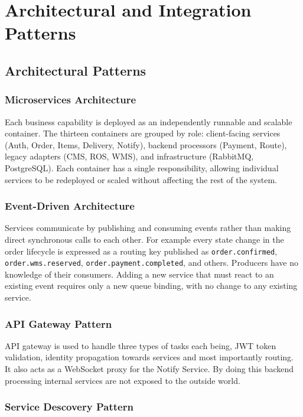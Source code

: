 \section{Architectural and Integration Patterns}
\subsection{Architectural Patterns}

\subsubsection{Microservices Architecture}

Each business capability is deployed as an independently runnable and scalable container. The thirteen containers are grouped by role: client-facing services (Auth, Order, Items, Delivery, Notify), backend processors (Payment, Route), legacy adapters (CMS, ROS, WMS), and infrastructure (RabbitMQ, PostgreSQL). Each container has a single responsibility, allowing individual services to be redeployed or scaled without affecting the rest of the system.

\subsubsection{Event-Driven Architecture}

Services communicate by publishing and consuming events rather than making direct synchronous calls to each other. For example every state change in the order lifecycle is expressed as a routing key published as \texttt{order.confirmed}, \texttt{order.wms.reserved}, \texttt{order.payment.completed}, and others. Producers have no knowledge of their consumers. Adding a new service that must react to an existing event requires only a new queue binding, with no change to any existing service. 

\subsubsection{API Gateway Pattern}

API gateway is used to handle three types of tasks each being, JWT token validation, identity propagation towards services and most importantly routing. It also acts as a WebSocket proxy for the Notify Service. By doing this backend processing internal services are not exposed to the outside world.

\subsubsection{Service Descovery Pattern}

